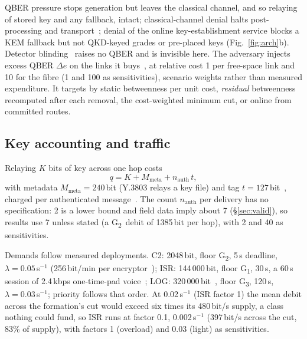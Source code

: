 \documentclass[conference,a4paper]{IEEEtran}
\newcommand{\GI}{G\textsubscript{1}}
\newcommand{\GII}{G\textsubscript{2}}
\newcommand{\GIII}{G\textsubscript{3}}
\begin{document}
QBER pressure stops generation but leaves the classical channel, and so relaying of
stored key and any fallback, intact; classical-channel denial halts post-processing
and transport~\cite{mehic}; denial of the online key-establishment service blocks a
KEM fallback but not QKD-keyed grades or pre-placed keys (Fig.~\ref{fig:arch}b).
Detector blinding~\cite{lydersen} raises no QBER and is invisible here. The adversary
injects excess QBER $\Delta e$ on the links it buys~\cite{schartner}, at relative cost
1 per free-space link and 10 for the fibre (1 and 100 as sensitivities), scenario
weights rather than measured expenditure. It targets by static betweenness per unit
cost, \emph{residual} betweenness recomputed after each removal, the cost-weighted
minimum cut, or online from committed routes.

\subsection{Key accounting and traffic}\label{sec:acct}
Relaying $K$ bits of key across one hop costs
\begin{equation}\label{eq:debit}
q=K+M_{\mathrm{meta}}+n_{\mathrm{auth}}\,t,
\end{equation}
with metadata $M_{\mathrm{meta}}=240$\,bit (Y.3803 relays a key file) and tag
$t=127$\,bit~\cite{walenta}, charged per authenticated message~\cite{fung}. The count $n_{\mathrm{auth}}$ per delivery has no specification: 2 is a lower bound and field data imply about 7 (\S\ref{sec:valid}), so results use 7 unless stated (a \GII\ debit of 1385\,bit per hop), with 2 and 40 as sensitivities.

Demands follow measured deployments. C2: 2048\,bit, floor \GII, 5\,s deadline,
$\lambda=0.05$\,s$^{-1}$ (256\,bit/min per encryptor~\cite{stucki}); ISR:
144\,000\,bit, floor \GI, 30\,s, a 60\,s session of 2.4\,kbps one-time-pad
voice~\cite{chen}; LOG: 320\,000\,bit~\cite{chen}, floor \GIII, 120\,s,
$\lambda=0.03$\,s$^{-1}$; priority follows that order. At 0.02\,s$^{-1}$ (ISR factor 1) the mean debit across the formation's cut would exceed six times its 480\,bit/s supply, a class nothing could fund, so ISR runs at factor 0.1, 0.002\,s$^{-1}$ (397\,bit/s across the cut, 83\% of supply), with factors 1 (overload) and 0.03 (light) as sensitivities.
\end{document}
